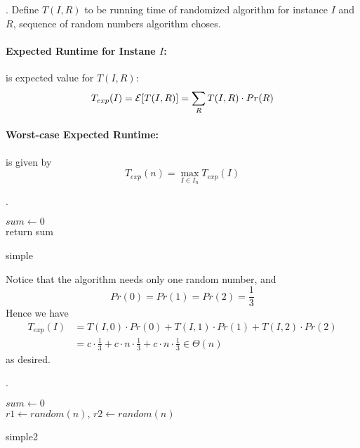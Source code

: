 \documentclass{article}
\begin{document}
\begin{discovery}[].
    Define $T(I,R)$ to be running time of randomized algorithm for instance $I$ and $R$, sequence of random numbers algorithm choses. 
\end{discovery}

\paragraph{Expected Runtime for Instane $I$:} is expected value for $T(I, R)$: 
\[ T_{exp}(I) = {\mathcal{E}}[T(I, R)] = \sum_{R} T(I, R) \cdot Pr(R) \]

\paragraph{Worst-case Expected Runtime:} is given by 
\[ T_{exp}(n) = \max_{I \in I_n} T_{exp}(I) \]

\begin{examplee}[].
    \begin{algorithm}[H] 
        $sum \leftarrow 0$ \\ 
         {
            return sum} 
        \caption{simple}
    \end{algorithm}
\end{examplee}

\begin{solution}
    Notice that the algorithm needs only one random number, and 
    \[ Pr(0) = Pr(1) = Pr(2) = \frac{1}{3} \]
    Hence we have \begin{align*}
        T_{exp}(I) 
        & = T(I, 0) \cdot Pr(0) + T(I, 1) \cdot Pr(1) + T(I, 2) \cdot Pr(2) \\ 
        & = c \cdot \frac{1}{3} + c \cdot n \cdot \frac{1}{3} + c \cdot n \cdot \frac{1}{3} \in \Theta(n)
    \end{align*}
    as desired. 
\end{solution}

\begin{examplee}[].
    \begin{algorithm}[H] 
        $sum \leftarrow 0$ \\ 
        $r1 \leftarrow random(n)$, $r2 \leftarrow random(n)$ \\ 
        \caption{simple2}
    \end{algorithm}
\end{examplee}
\end{document}

